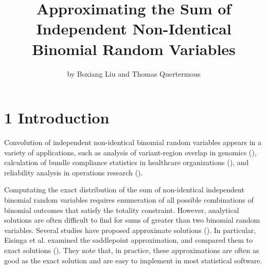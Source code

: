 \graphicspath{{fig/}}

\title{Approximating the Sum of Independent Non-Identical Binomial Random Variables}
\author{by Boxiang Liu and Thomas Quertermous}

\maketitle


\section{1 Introduction}

Convolution of independent non-identical binomial random variables appears in a variety of applications, such as analysis of variant-region overlap in genomics (\cite{Schmidt:2015ca}), calculation of bundle compliance statistics in healthcare organizations (\cite{Benneyan:2010ex}), and reliability analysis in operations research (\cite{Anonymous:iz}). 

Computating the exact distribution of the sum of non-identical independent binomial random variables requires enumeration of all possible combinations of binomial outcomes that satisfy the totality constraint. However, analytical solutions are often difficult to find for sums of greater than two binomial random variables. Several studies have proposed approximate solutions  (\cite{Johnson:2005hg,Jolayemi:1992jz}). In particular, Eisinga et al. examined  the saddlepoint approximation, and compared them to exact solutions (\cite{Eisinga:2013da}). They note that, in practice, these approximations are often as good as the exact solution and are easy to implement in most statistical software. 

